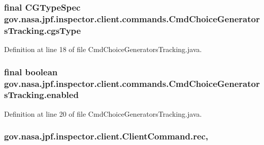 \subsubsection[{\texorpdfstring{cgs\+Type}{cgsType}}]{\setlength{\rightskip}{0pt plus 5cm}final {\bf C\+G\+Type\+Spec} gov.\+nasa.\+jpf.\+inspector.\+client.\+commands.\+Cmd\+Choice\+Generators\+Tracking.\+cgs\+Type\hspace{0.3cm}{\ttfamily [private]}}\hypertarget{classgov_1_1nasa_1_1jpf_1_1inspector_1_1client_1_1commands_1_1_cmd_choice_generators_tracking_a407320f69637c99aa4a82d78cfc5ae07}{}\label{classgov_1_1nasa_1_1jpf_1_1inspector_1_1client_1_1commands_1_1_cmd_choice_generators_tracking_a407320f69637c99aa4a82d78cfc5ae07}


Definition at line 18 of file Cmd\+Choice\+Generators\+Tracking.\+java.

\subsubsection[{\texorpdfstring{enabled}{enabled}}]{\setlength{\rightskip}{0pt plus 5cm}final boolean gov.\+nasa.\+jpf.\+inspector.\+client.\+commands.\+Cmd\+Choice\+Generators\+Tracking.\+enabled\hspace{0.3cm}{\ttfamily [private]}}\hypertarget{classgov_1_1nasa_1_1jpf_1_1inspector_1_1client_1_1commands_1_1_cmd_choice_generators_tracking_a71cada56aa7d86442e42fa24303eadaa}{}\label{classgov_1_1nasa_1_1jpf_1_1inspector_1_1client_1_1commands_1_1_cmd_choice_generators_tracking_a71cada56aa7d86442e42fa24303eadaa}


Definition at line 20 of file Cmd\+Choice\+Generators\+Tracking.\+java.

\subsubsection[{\texorpdfstring{rec}{rec}}]{ gov.\+nasa.\+jpf.\+inspector.\+client.\+Client\+Command.\+rec\hspace{0.3cm}{\ttfamily [protected]}, {\ttfamily [inherited]}}\hypertarget{classgov_1_1nasa_1_1jpf_1_1inspector_1_1client_1_1_client_command_af4246f2427035c72a6af45a2c61361f7}{}\label{classgov_1_1nasa_1_1jpf_1_1inspector_1_1client_1_1_client_command_af4246f2427035c72a6af45a2c61361f7}


